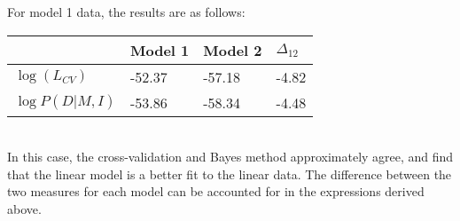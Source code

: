 \documentclass[12pt]{article}
\begin{document}
For model 1 data, the results are as follows:\\
\begin{tabular}{llll}
\hline
& Model 1 & Model 2 & $\Delta_{12}$\\
\hline
$\log(L_{CV})$ & -52.37 &  -57.18  & -4.82\\
$\log P(D|M,I)$ & -53.86 &  -58.34  & -4.48\\
\hline
\end{tabular}\\
In this case, the cross-validation and Bayes method approximately
agree, and find that the linear model is a better fit to the linear data.
The difference between the two measures for each model can be accounted
for in the expressions derived above.
\end{document}
